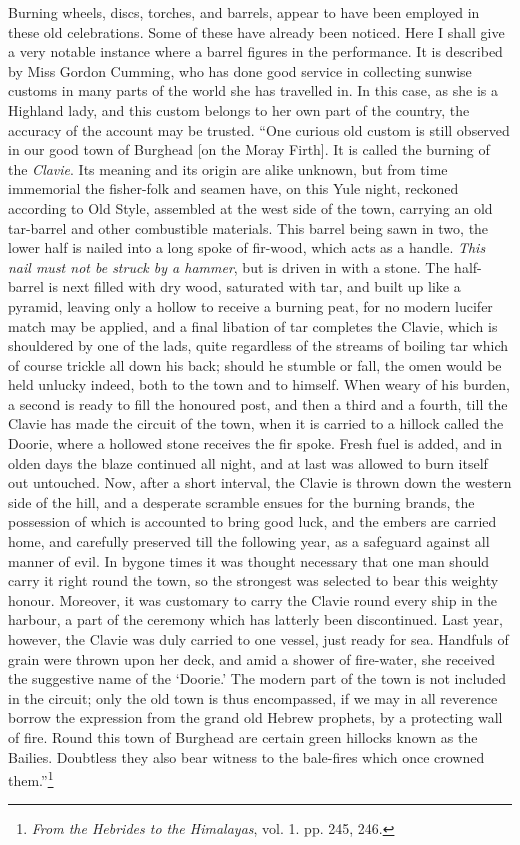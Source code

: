 \documentclass[a4paper, 11pt, oneside, polutonikogreek, english]{article}
\begin{document}
Burning wheels, discs, torches, and barrels, appear to have been employed in these old celebrations. Some of these have already been noticed. Here I shall give a very notable instance where a barrel figures in the performance. It is described by Miss Gordon Cumming, who has done good service in collecting sunwise customs in many parts of the world she has travelled in. In this case, as she is a Highland lady, and this custom belongs to her own part of the country, the accuracy of the account may be trusted. ``One curious old custom is still observed in our good town of Burghead [on the Moray Firth]. It is called the burning of the \emph{Clavie}. Its meaning and its origin are alike unknown, but from time immemorial the fisher-folk and seamen have, on this Yule night, reckoned according to Old Style, assembled at the west side of the town, carrying an old tar-barrel and other combustible materials. This barrel being sawn in two, the lower half is nailed into a long spoke of fir-wood, which acts as a handle. \emph{This nail must not be struck by a hammer}, but is driven in with a stone. The half-barrel is next filled with dry wood, saturated with tar, and built up like a pyramid, leaving only a hollow to receive a burning peat, for no modern lucifer match may be applied, and a final libation of tar completes the Clavie, which is shouldered by one of the lads, quite regardless of the streams of boiling tar which of course trickle all down his back; should he stumble or fall, the omen would be held unlucky indeed, both to the town and to himself. When weary of his burden, a second is ready to fill the honoured post, and then a third and a fourth, till the Clavie has made the circuit of the town, when it is carried to a hillock called the Doorie, where a hollowed stone receives the fir spoke. Fresh fuel is added, and in olden days the blaze continued all night, and at last was allowed to burn itself out untouched. Now, after a short interval, the Clavie is thrown down the western side of the hill, and a desperate scramble ensues for the burning brands, the possession of which is accounted to bring good luck, and the embers are carried home, and carefully preserved till the following year, as a safeguard against all manner of evil. In bygone times it was thought necessary that one man should carry it right round the town, so the strongest was selected to bear this weighty honour. Moreover, it was customary to carry the Clavie round every ship in the harbour, a part of the ceremony which has latterly been discontinued. Last year, however, the Clavie was duly carried to one vessel, just ready for sea. Handfuls of grain were thrown upon her deck, and amid a shower of fire-water, she received the suggestive name of the `Doorie.' The modern part of the town is not included in the circuit; only the old town is thus encompassed, if we may in all reverence borrow the expression from the grand old Hebrew prophets, by a protecting wall of fire. Round this town of Burghead are certain green hillocks known as the Bailies. Doubtless they also bear witness to the bale-fires which once crowned them.''\footnote{\emph{From the Hebrides to the Himalayas}, vol. 1. pp. 245, 246.}
\end{document}
